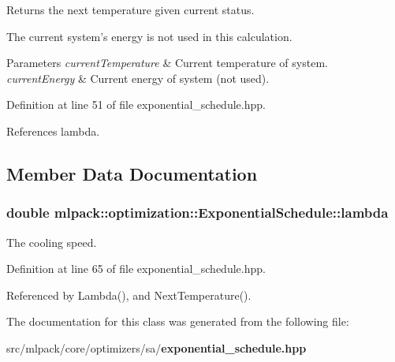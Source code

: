 Returns the next temperature given current status. 

The current system's energy is not used in this calculation.


\begin{DoxyParams}{Parameters}
{\em current\-Temperature} & Current temperature of system. \\
\hline
{\em current\-Energy} & Current energy of system (not used). \\
\hline
\end{DoxyParams}


Definition at line 51 of file exponential\-\_\-schedule.\-hpp.



References lambda.



\subsection{Member Data Documentation}
\subsubsection[{lambda}]{\setlength{\rightskip}{0pt plus 5cm}double mlpack\-::optimization\-::\-Exponential\-Schedule\-::lambda\hspace{0.3cm}{\ttfamily [private]}}\label{classmlpack_1_1optimization_1_1ExponentialSchedule_adc7beb2e3179c579f16c5eddcaf80291}


The cooling speed. 



Definition at line 65 of file exponential\-\_\-schedule.\-hpp.



Referenced by Lambda(), and Next\-Temperature().



The documentation for this class was generated from the following file\-:\begin{DoxyCompactItemize}
\item 
src/mlpack/core/optimizers/sa/{\bf exponential\-\_\-schedule.\-hpp}\end{DoxyCompactItemize}

